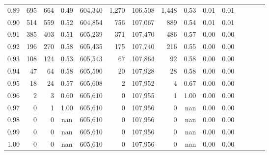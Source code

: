 \begin{tabular}{rrrcrrrrrrrrrrr}
0.89 &     695 &    664 &                                       0.49 &  604,340 &    1,270 &  106,508 &    1,448 &  0.53 &  0.01 &                         0.01 \\
0.90 &     514 &    559 &                                       0.52 &  604,854 &      756 &  107,067 &      889 &  0.54 &  0.01 &                         0.01 \\
0.91 &     385 &    403 &                                       0.51 &  605,239 &      371 &  107,470 &      486 &  0.57 &  0.00 &                         0.00 \\
0.92 &     196 &    270 &                                       0.58 &  605,435 &      175 &  107,740 &      216 &  0.55 &  0.00 &                         0.00 \\
0.93 &     108 &    124 &                                       0.53 &  605,543 &       67 &  107,864 &       92 &  0.58 &  0.00 &                         0.00 \\
0.94 &      47 &     64 &                                       0.58 &  605,590 &       20 &  107,928 &       28 &  0.58 &  0.00 &                         0.00 \\
0.95 &      18 &     24 &                                       0.57 &  605,608 &        2 &  107,952 &        4 &  0.67 &  0.00 &                         0.00 \\
0.96 &       2 &      3 &                                       0.60 &  605,610 &        0 &  107,955 &        1 &  1.00 &  0.00 &                         0.00 \\
0.97 &       0 &      1 &                                       1.00 &  605,610 &        0 &  107,956 &        0 &   nan &  0.00 &                         0.00 \\
0.98 &       0 &      0 &                                        nan &  605,610 &        0 &  107,956 &        0 &   nan &  0.00 &                         0.00 \\
0.99 &       0 &      0 &                                        nan &  605,610 &        0 &  107,956 &        0 &   nan &  0.00 &                         0.00 \\
1.00 &       0 &      0 &                                        nan &  605,610 &        0 &  107,956 &        0 &   nan &  0.00 &                         0.00 \\
\bottomrule
\end{tabular}
